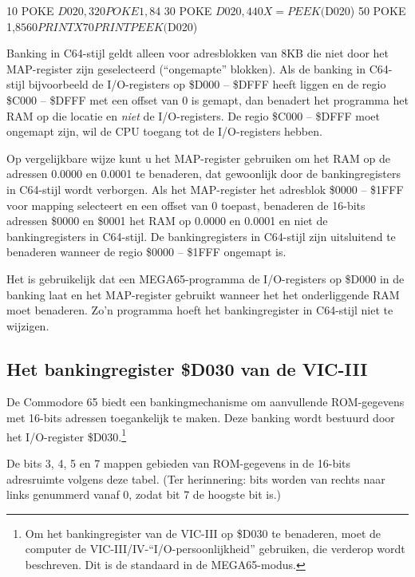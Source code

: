 \begin{basiccode}
10 POKE $D020,3
20 POKE 1,$84
30 POKE $D020,4
40 X=PEEK($D020)
50 POKE 1,$85
60 PRINT X
70 PRINT PEEK($D020)
\end{basiccode}

Banking in C64-stijl geldt alleen voor adresblokken van 8KB die niet door het MAP-register zijn geselecteerd (``ongemapte'' blokken). Als de banking in C64-stijl bijvoorbeeld de I/O-registers op \$D000 -- \$DFFF heeft liggen en de regio \$C000 -- \$DFFF met een offset van 0 is gemapt, dan benadert het programma het RAM op die locatie en {\em niet} de I/O-registers. De regio \$C000 -- \$DFFF moet ongemapt zijn, wil de CPU toegang tot de I/O-registers hebben.

Op vergelijkbare wijze kunt u het MAP-register gebruiken om het RAM op de adressen 0.0000 en 0.0001 te benaderen, dat gewoonlijk door de bankingregisters in C64-stijl wordt verborgen. Als het MAP-register het adresblok \$0000 -- \$1FFF voor mapping selecteert en een offset van 0 toepast, benaderen de 16-bits adressen \$0000 en \$0001 het RAM op 0.0000 en 0.0001 en niet de bankingregisters in C64-stijl. De bankingregisters in C64-stijl zijn uitsluitend te benaderen wanneer de regio \$0000 -- \$1FFF ongemapt is.

Het is gebruikelijk dat een MEGA65-programma de I/O-registers op \$D000 in de banking laat en het MAP-register gebruikt wanneer het het onderliggende RAM moet benaderen. Zo'n programma hoeft het bankingregister in C64-stijl niet te wijzigen.

\subsection{Het bankingregister \$D030 van de VIC-III}

De Commodore 65 biedt een bankingmechanisme om aanvullende ROM-gegevens met 16-bits adressen toegankelijk te maken. Deze banking wordt bestuurd door het I/O-register \$D030.\footnote{Om het bankingregister van de VIC-III op \$D030 te benaderen, moet de computer de VIC-III/IV-``I/O-persoonlijkheid'' gebruiken, die verderop wordt beschreven. Dit is de standaard in de MEGA65-modus.}

De bits 3, 4, 5 en 7 mappen gebieden van ROM-gegevens in de 16-bits adresruimte volgens deze tabel. (Ter herinnering: bits worden van rechts naar links genummerd vanaf 0, zodat bit 7 de hoogste bit is.)

